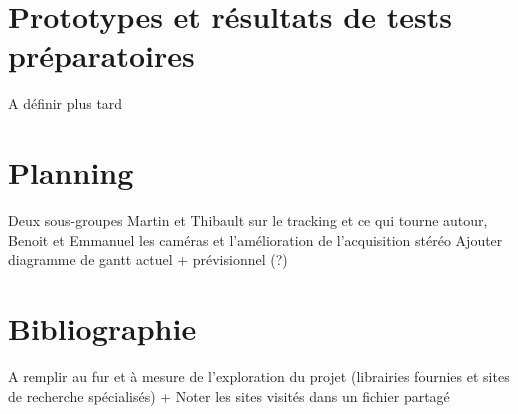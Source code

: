 \documentclass{article}
\begin{document}
\section{Prototypes et résultats de tests préparatoires}
A définir plus tard

\section{Planning}
Deux sous-groupes
Martin et Thibault sur le tracking et ce qui tourne autour, Benoit et Emmanuel les caméras et l'amélioration de l'acquisition stéréo
Ajouter diagramme de gantt actuel + prévisionnel (?)

\section{Bibliographie}
A remplir au fur et à mesure de l'exploration du projet (librairies fournies et sites de recherche spécialisés) + Noter les sites visités dans un fichier partagé
 
 
\end{document}
